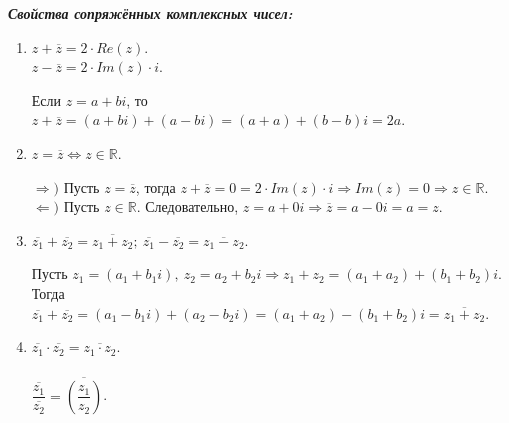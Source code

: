 \textbf{\textit{Свойства сопряжённых комплексных чисел:}}\begin{enumerate}
	\item $z + \overline{z} = 2\cdot Re(z)$.\\
	$z - \overline{z} = 2\cdot Im(z)\cdot i$.\begin{Proof}
		Если $z = a + bi$, то $z + \overline{z} = (a+bi) + (a-bi) = (a+a) + (b-b)i = 2a$.
	\end{Proof}
	\item $z = \overline{z}\Longleftrightarrow z\in \mathbb{R}$.\begin{Proof}
		$\Rightarrow)$ Пусть $z = \overline{z}$, тогда $z + \overline{z} = 0 = 2\cdot Im(z)\cdot i\Rightarrow Im(z) = 0\Rightarrow z\in\mathbb{R}$.\\
		$\Leftarrow)$ Пусть $z\in\mathbb{R}$. Следовательно, $z = a + 0i\Rightarrow \overline{z} = a - 0i = a = z$.
	\end{Proof}
	\item $\overline{z_1} + \overline{z_2} = \overline{z_1 + z_2};\ \overline{z_1} - \overline{z_2} = \overline{z_1 - z_2}$.\begin{Proof}
		Пусть $z_1 = (a_1 + b_1i),\ z_2 = a_2 + b_2 i \Rightarrow z_1 + z_2 = (a_1 + a_2) + (b_1 + b_2) i$. Тогда $\overline{z_1} + \overline{z_2} = (a_1 - b_1i) + (a_2 - b_2 i) = (a_1 + a_2) - (b_1 +b_2) i = \overline{z_1 + z_2}$.
	\end{Proof}
	\item $\overline{z_1}\cdot\overline{z_2} = \overline{z_1\cdot z_2}$.\\\\
	$\dfrac{\overline{z_1}}{\overline{z_2}} = \overline{\left(\dfrac{z_1}{z_2}\right)}$.
\end{enumerate}











